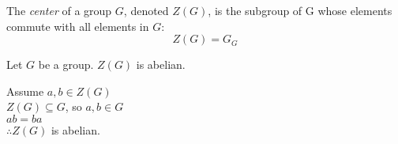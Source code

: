 \documentclass[letterpaper,12pt,fleqn]{article}
\begin{document}
\begin{definition}
  The \emph{center} of a group $G$, denoted $Z(G)$, is the subgroup of G
  whose elements commute with all elements in $G$:
  \[Z(G)=G_G\]
\end{definition}

\begin{theorem}
  Let $G$ be a group. $Z(G)$ is abelian.
\end{theorem}

\begin{theproof}
  Assume $a,b\in Z(G)$ \\
  $Z(G)\subseteq G$, so $a,b\in G$ \\
  $ab=ba$ \\
  $\therefore Z(G)$ is abelian.
\end{theproof}
\end{document}
